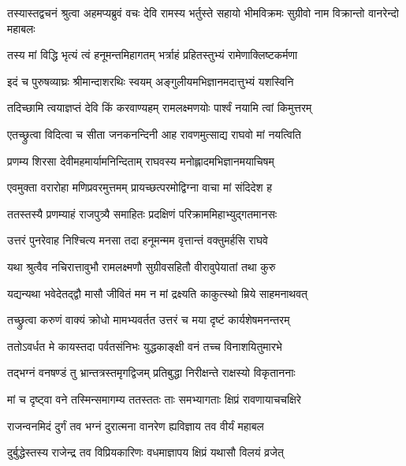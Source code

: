 \threelineshloka
{तस्यास्तद्वचनं श्रुत्वा अहमप्यब्रुवं वचः}
{देवि रामस्य भर्तुस्ते सहायो भीमविक्रमः}
{सुग्रीवो नाम विक्रान्तो वानरेन्दो महाबलः} %

\twolineshloka
{तस्य मां विद्धि भृत्यं त्वं हनूमन्तमिहागतम्}
{भर्त्राहं प्रहितस्तुभ्यं रामेणाक्लिष्टकर्मणा} %

\twolineshloka
{इदं च पुरुषव्याघ्रः श्रीमान्दाशरथिः स्वयम्}
{अङ्गुलीयमभिज्ञानमदात्तुभ्यं यशस्विनि} %

\twolineshloka
{तदिच्छामि त्वयाज्ञप्तं देवि किं करवाण्यहम्}
{रामलक्ष्मणयोः पार्श्वं नयामि त्वां किमुत्तरम्} %

\twolineshloka
{एतच्छ्रुत्वा विदित्वा च सीता जनकनन्दिनी}
{आह रावणमुत्साद्य राघवो मां नयत्विति} %

\twolineshloka
{प्रणम्य शिरसा देवीमहमार्यामनिन्दिताम्}
{राघवस्य मनोह्लादमभिज्ञानमयाचिषम्} %

\twolineshloka
{एवमुक्ता वरारोहा मणिप्रवरमुत्तमम्}
{प्रायच्छत्परमोद्विग्ना वाचा मां संदिदेश ह} %

\twolineshloka
{ततस्तस्यै प्रणम्याहं राजपुत्र्यै समाहितः}
{प्रदक्षिणं परिक्राममिहाभ्युद्गतमानसः} %

\twolineshloka
{उत्तरं पुनरेवाह निश्चित्य मनसा तदा}
{हनूमन्मम वृत्तान्तं वक्तुमर्हसि राघवे} %

\twolineshloka
{यथा श्रुत्वैव नचिरात्तावुभौ रामलक्ष्मणौ}
{सुग्रीवसहितौ वीरावुपेयातां तथा कुरु} %

\twolineshloka
{यद्यन्यथा भवेदेतद्द्वौ मासौ जीवितं मम}
{न मां द्रक्ष्यति काकुत्स्थो म्रिये साहमनाथवत्} %

\twolineshloka
{तच्छ्रुत्वा करुणं वाक्यं क्रोधो मामभ्यवर्तत}
{उत्तरं च मया दृष्टं कार्यशेषमनन्तरम्} %

\twolineshloka
{ततोऽवर्धत मे कायस्तदा पर्वतसंनिभः}
{युद्धकाङ्क्षी वनं तच्च विनाशयितुमारभे} %

\twolineshloka
{तद्भग्नं वनषण्डं तु भ्रान्तत्रस्तमृगद्विजम्}
{प्रतिबुद्धा निरीक्षन्ते राक्षस्यो विकृताननाः} %

\twolineshloka
{मां च दृष्ट्वा वने तस्मिन्समागम्य ततस्ततः}
{ताः समभ्यागताः क्षिप्रं रावणायाचचक्षिरे} %

\twolineshloka
{राजन्वनमिदं दुर्गं तव भग्नं दुरात्मना}
{वानरेण ह्यविज्ञाय तव वीर्यं महाबल} %

\twolineshloka
{दुर्बुद्धेस्तस्य राजेन्द्र तव विप्रियकारिणः}
{वधमाज्ञापय क्षिप्रं यथासौ विलयं व्रजेत्} %

